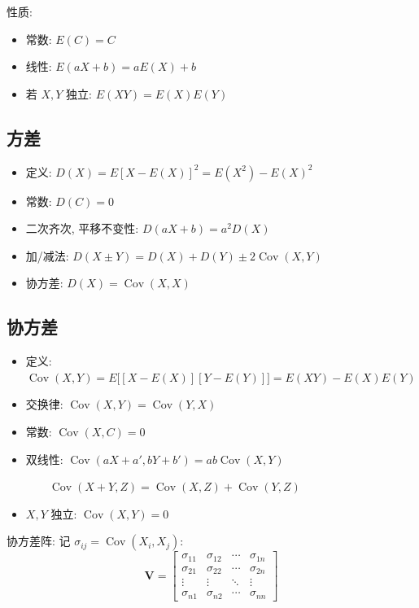 \documentclass[UTF8]{ctexart}
\newcommand{\ve}[1]{\boldsymbol{\mathbf{#1}}}
\DeclareMathOperator{\Cov}{Cov}
\begin{document}
性质:
\begin{itemize}
    \item 常数: $ E(C) = C $
    \item 线性: $ E(a X + b) = a E(X) + b $
    \item 若 $ X, Y $ 独立: $ E(XY) = E(X)E(Y) $
\end{itemize}


\subsection{方差}
\begin{itemize}
    \item 定义: $ D(X) = E[X - E(X)]^2 = E(X^2) - E(X)^2 $
    \item 常数: $ D(C) = 0 $
    \item 二次齐次, 平移不变性: $ D(a X + b) = a^2 D(X) $
    \item 加/减法: $ D(X \pm Y) = D(X) + D(Y) \pm 2\Cov(X, Y) $
    \item 协方差: $ D(X) = \Cov(X, X) $
\end{itemize}

\subsection{协方差}
\begin{itemize}
    \item 定义: $ \Cov(X, Y) = E\big[[X - E(X)][Y - E(Y)]\big] = E(X Y) - E(X) E(Y) $
    \item 交换律: $ \Cov(X, Y) = \Cov(Y, X) $
    \item 常数: $ \Cov(X, C) = 0 $
    \item 双线性: $ \Cov(a X + a', b Y + b') = ab \Cov(X, Y) $
    
    $ \qquad \Cov(X + Y, Z) = \Cov(X, Z) + \Cov(Y, Z) $
    \item $ X, Y $ 独立: $ \Cov(X, Y) = 0 $
\end{itemize}

协方差阵:
记 $ \sigma_{i j} = \Cov(X_i, X_j) $:
\[ \ve V = \begin{bmatrix}
    \sigma_{11} & \sigma_{12} & \cdots & \sigma_{1n} \\ 
    \sigma_{21} & \sigma_{22} & \cdots & \sigma_{2n} \\
    \vdots & \vdots & \ddots & \vdots \\
    \sigma_{n1} & \sigma_{n2} & \cdots & \sigma_{nn}
\end{bmatrix} \]
\end{document}
